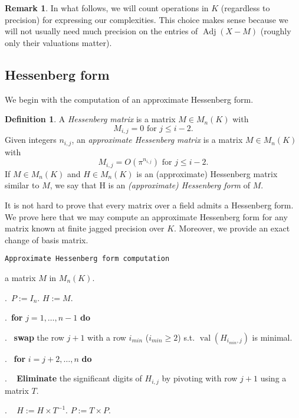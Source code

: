 \documentclass[sigconf]{acmart}
\DeclareMathOperator{\val}{val}
\DeclareMathOperator{\adj}{Adj}
\theoremstyle{definition}
\newtheorem{rem}[theo]{Remark}
\newtheorem{deftn}[theo]{Definition}
\begin{document}
\begin{rem}
In what follows, we will count operations in $K$ (regardless to 
precision) for expressing our complexities. This choice makes sense 
because we will not usually need much precision on the entries of 
$\adj(X{-}M)$ (roughly only their valuations matter).
\end{rem}

\subsection{Hessenberg form}

We begin with the computation of
an approximate Hessenberg form.

\begin{deftn}
A \emph{Hessenberg matrix} is a matrix $M \in M_n(K)$ with
\[
M_{i,j}=0 \mbox{ for $j \le i-2$.}
\]
Given integers $n_{i,j}$, an \emph{approximate Hessenberg matrix}
is a matrix $M \in M_n(K)$ with
\[
M_{i,j} = O(\pi^{n_{i,j}}) \mbox{ for $j \le i-2$.}
\]
If $M \in M_n (K)$ and $H \in M_n (K)$ is an (approximate) Hessenberg matrix
similar to $M$, we say that H is an \emph{(approximate) Hessenberg form} of $M.$
\end{deftn}

It is not hard to prove that every matrix over a field admits
a Hessenberg form.
We prove here that we may compute an approximate Hessenberg form 
for any matrix known at finite jagged precision over $K$.
Moreover, we provide an exact change of basis matrix.

\noindent\hrulefill

 {\tt Approximate Hessenberg form computation}

 a matrix $M$ in $M_n(K).$

\smallskip

.\ $P:=I_n.$ \: $H:=M.$


.\ {\bf for} $j=1,\dots,n-1$ {\bf do} 

.\  \:  {\bf swap} the row $j+1$ with a row $i_{min}$ ($i_{min} \geq 2$) s.t. $\val(H_{i_{min},j})$ is minimal. 

.\  \:  {\bf for} $i=j+2,\dots,n$ {\bf do} 

. \ \: \:  \textbf{Eliminate} the significant digits of $H_{i,j}$ by pivoting with row $j+1$ 
using a matrix $T.$

. \ \: \:  $H:=H \times T^{-1}.$ \: $P:=T \times P.$
\end{document}
